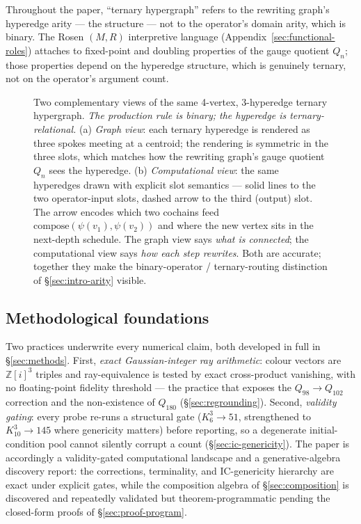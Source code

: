 \documentclass[12pt,a4paper]{article}
\theoremstyle{definition}
\theoremstyle{remark}
\newcommand{\bZ}{\mathbb{Z}}
\newcommand{\Qn}{Q_n}
\begin{document}
Throughout the paper, ``ternary hypergraph'' refers to the rewriting
graph's hyperedge arity --- the structure --- not to the operator's
domain arity, which is binary. The Rosen $(M, R)$ interpretive language
(Appendix~\ref{sec:functional-roles}) attaches to
fixed-point and doubling properties of the gauge quotient $\Qn$; those
properties depend on the hyperedge structure, which is genuinely
ternary, not on the operator's argument count.

\begin{figure}[H]
\centering

\caption{Two complementary views of the same 4-vertex, 3-hyperedge
ternary hypergraph. \emph{The production rule is binary; the hyperedge
is ternary-relational.} (a) \emph{Graph view}: each ternary hyperedge is
rendered as three spokes meeting at a centroid; the rendering is
symmetric in the three slots, which matches how the rewriting graph's
gauge quotient $\Qn$ sees the hyperedge. (b) \emph{Computational view}:
the same hyperedges drawn with explicit slot semantics --- solid lines
to the two operator-input slots, dashed arrow to the third (output)
slot. The arrow encodes which two cochains feed
$\mathrm{compose}(\psi(v_1), \psi(v_2))$ and where the new vertex sits
in the next-depth schedule. The graph view says \emph{what is
connected}; the computational view says \emph{how each step
rewrites}. Both are accurate; together they make the binary-operator /
ternary-routing distinction of \S\ref{sec:intro-arity}
visible.}\label{fig:binary-ternary-layered}
\end{figure}

\subsection{Methodological foundations}\label{sec:intro-methods}

Two practices underwrite every numerical claim, both developed in full
in \S\ref{sec:methods}. First, \emph{exact Gaussian-integer ray
arithmetic}: colour vectors are $\bZ[i]^3$ triples and ray-equivalence
is tested by exact cross-product vanishing, with no floating-point
fidelity threshold --- the practice that exposes the $Q_{98}\to Q_{102}$
correction and the non-existence of $Q_{180}$ (\S\ref{sec:regrounding}).
Second, \emph{validity gating}: every probe re-runs a structural gate
($K_6^3\to 51$, strengthened to $K_{10}^3\to 145$ where genericity
matters) before reporting, so a degenerate initial-condition pool cannot
silently corrupt a count (\S\ref{sec:ic-genericity}). The paper is
accordingly a validity-gated computational landscape and a
generative-algebra discovery report: the corrections, terminality, and
IC-genericity hierarchy are exact under explicit gates, while the
composition algebra of \S\ref{sec:composition} is discovered and
repeatedly validated but theorem-programmatic pending the closed-form
proofs of \S\ref{sec:proof-program}.
\end{document}
